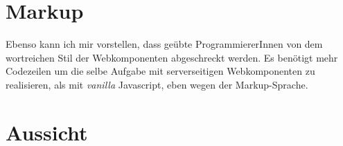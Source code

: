 \section{Markup}
Ebenso kann ich mir vorstellen, dass geübte ProgrammiererInnen von dem wortreichen Stil der Webkomponenten abgeschreckt werden. Es benötigt mehr Codezeilen um die selbe Aufgabe mit serverseitigen Webkomponenten zu realisieren, als mit \textit{vanilla} Javascript, eben wegen der Markup-Sprache.


\section{Aussicht}